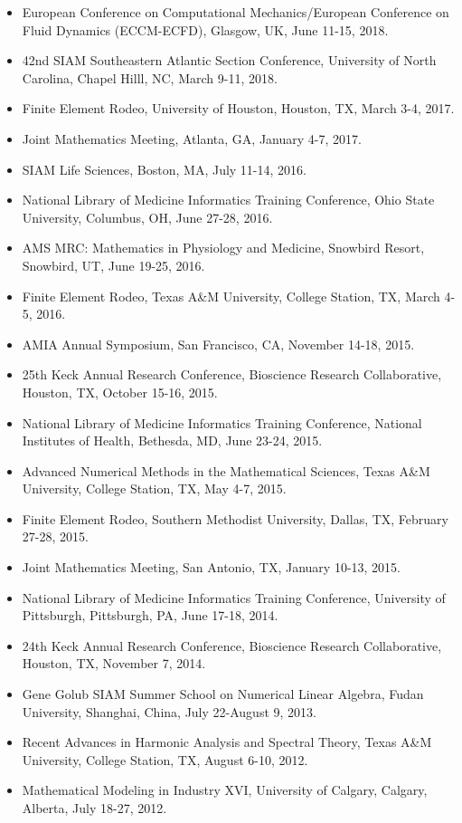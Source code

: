 \documentclass{article} %
\begin{document}
\begin{itemize}
\item European Conference on Computational Mechanics/European Conference on Fluid Dynamics (ECCM-ECFD), Glasgow, UK, June 11-15, 2018.
\item 42nd SIAM Southeastern Atlantic Section Conference, University of North Carolina, Chapel Hilll, NC, March 9-11, 2018.
\item Finite Element Rodeo, University of Houston, Houston, TX, March 3-4, 2017.
\item Joint Mathematics Meeting, Atlanta, GA, January 4-7, 2017.
\item SIAM Life Sciences, Boston, MA, July 11-14, 2016.
\item National Library of Medicine Informatics Training Conference, Ohio State University, Columbus, OH, June 27-28, 2016.
\item AMS MRC: Mathematics in Physiology and Medicine, Snowbird Resort, Snowbird, UT, June 19-25, 2016.
\item Finite Element Rodeo, Texas A\&M University, College Station, TX, March 4-5, 2016.
\item AMIA Annual Symposium, San Francisco, CA, November 14-18, 2015.
\item 25th Keck Annual Research Conference, Bioscience Research Collaborative, Houston, TX, October 15-16, 2015.
\item National Library of Medicine Informatics Training Conference, National Institutes of Health, Bethesda, MD, June 23-24, 2015.
\item Advanced Numerical Methods in the Mathematical Sciences, Texas A\&M University, College Station, TX, May 4-7, 2015.
\item Finite Element Rodeo, Southern Methodist University, Dallas, TX,
 February 27-28, 2015.
\item Joint Mathematics Meeting, San Antonio, TX, January 10-13, 2015. 
\item National Library of Medicine Informatics Training Conference, University of Pittsburgh, Pittsburgh, PA, June 17-18, 2014.
\item 24th Keck Annual Research Conference, Bioscience Research Collaborative, Houston, TX, November 7, 2014.
\item Gene Golub SIAM Summer School on Numerical Linear Algebra, Fudan University, Shanghai, China, July 22-August 9, 2013.
\item Recent Advances in Harmonic Analysis and Spectral Theory, Texas A\&M University, College Station, TX, August 6-10, 2012.
\item Mathematical Modeling in Industry XVI, University of Calgary, Calgary, Alberta, July 18-27, 2012.
\end{itemize}







\end{document}
